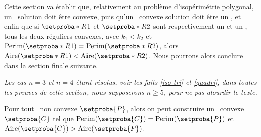 Cette section va établir que, relativement au problème d'isopérimétrie polygonal,
un \ngone\ solution doit être convexe, 
puis
qu'un \ngone\ convexe solution doit être un \nreg,
et enfin
que si $\setproba*{R}{1}$ et $\setproba*{R}{2}$ sont respectivement un  et un , tous les deux réguliers convexes, avec 
$k_1 < k_2$ et $\perim{\setproba*{R}{1}} = \perim{\setproba*{R}{2}}$, 
alors
$\area{\setproba*{R}{1}} < \area{\setproba*{R}{2}}$.
Nous pourrons alors conclure dans la section finale suivante.


\begin{tcolorbox}
	\itshape\small
	Les cas $n = 3$ et $n = 4$ étant résolus, voir les faits \ref{iso-tri} et \ref{quadri}, dans toutes les preuves de cette section, nous supposerons $n \geq 5$, pour ne pas alourdir le texte.
\end{tcolorbox}




\begin{fact} \label{must-be-conv}
    Pour tout \ngone\ non convexe $\setproba{P}$, alors on peut construire un \ngone\ convexe $\setproba{C}$ tel que
	$\perim{\setproba{C}} = \perim{\setproba{P}}$
	et
	$\area{\setproba{C}} > \area{\setproba{P}}$.
\end{fact}


